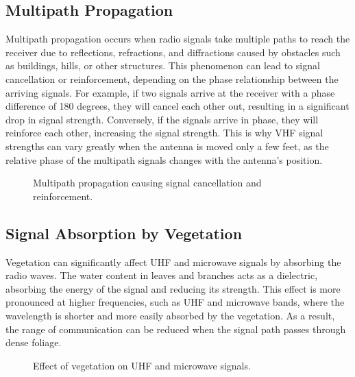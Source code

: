 \subsection*{Multipath Propagation}
Multipath propagation occurs when radio signals take multiple paths to reach the receiver due to reflections, refractions, and diffractions caused by obstacles such as buildings, hills, or other structures. This phenomenon can lead to signal cancellation or reinforcement, depending on the phase relationship between the arriving signals. For example, if two signals arrive at the receiver with a phase difference of 180 degrees, they will cancel each other out, resulting in a significant drop in signal strength. Conversely, if the signals arrive in phase, they will reinforce each other, increasing the signal strength. This is why VHF signal strengths can vary greatly when the antenna is moved only a few feet, as the relative phase of the multipath signals changes with the antenna's position.

\begin{figure}[h!]
    \centering
    \caption{Multipath propagation causing signal cancellation and reinforcement.}
    \label{fig:multipath_propagation}
\end{figure}

\subsection*{Signal Absorption by Vegetation}
Vegetation can significantly affect UHF and microwave signals by absorbing the radio waves. The water content in leaves and branches acts as a dielectric, absorbing the energy of the signal and reducing its strength. This effect is more pronounced at higher frequencies, such as UHF and microwave bands, where the wavelength is shorter and more easily absorbed by the vegetation. As a result, the range of communication can be reduced when the signal path passes through dense foliage.

\begin{figure}[h!]
    \centering
    \caption{Effect of vegetation on UHF and microwave signals.}
    \label{fig:vegetation_absorption}
\end{figure}

